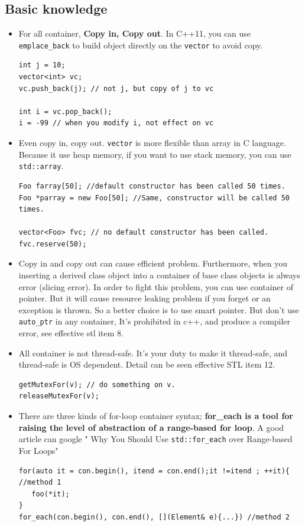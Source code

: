 \documentclass[a4paper,11pt,twoside]{book}
\begin{document}
\subsection{Basic knowledge}
\begin{itemize}

\item For all container, \textbf{Copy in, Copy out}. In C++11, you can use \texttt{emplace\_back} to build object directly on the \texttt{vector} to avoid copy.
\begin{lstlisting}[numbers=none]
int j = 10;
vector<int> vc;
vc.push_back(j); // not j, but copy of j to vc

int i = vc.pop_back(); 
i = -99 // when you modify i, not effect on vc
\end{lstlisting}

\item Even copy in, copy out. \texttt{vector} is more flexible than array in C language. Because it use heap memory, if you want to use stack memory, you can use \texttt{std::array}.
\begin{lstlisting}[numbers=none]
Foo farray[50]; //default constructor has been called 50 times.
Foo *parray = new Foo[50]; //Same, constructor will be called 50 times.

vector<Foo> fvc; // no default constructor has been called.
fvc.reserve(50);
\end{lstlisting}



\item Copy in and copy out can cause efficient problem. Furthermore, when you inserting a derived class object into a container of base class objects is always error (slicing error). In order to fight this problem, you can use container of pointer. But it will cause resource leaking problem if you forget or an exception is thrown. So a better choice is to use smart pointer. But don't use \texttt{auto\_ptr} in any container, It's prohibited in c++, and produce a compiler error, see effective stl item 8.

\item All container is not thread-safe. It's your duty to make it thread-safe, and thread-safe is OS dependent. Detail can be seen effective STL item 12.
\begin{lstlisting}[numbers=none]
getMutexFor(v); // do something on v.
releaseMutexFor(v);
\end{lstlisting}

\item There are three kinds of for-loop container syntax; \textbf{for\_each is a tool for raising the level of abstraction of a range-based for loop}. A good article can google " Why You Should Use \texttt{std::for\_each} over Range-based For Loops"
\begin{lstlisting}
for(auto it = con.begin(), itend = con.end();it !=itend ; ++it){ //method 1
   foo(*it);
}
for_each(con.begin(), con.end(), [](Element& e){...}) //method 2


\end{lstlisting}
\end{itemize}
\end{document}
